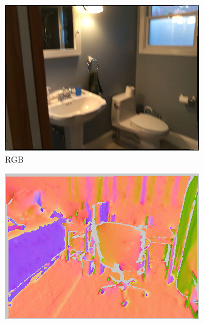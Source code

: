 \begin{figure}
\begin{minipage}{0.19\linewidth}
     \includegraphics[width=\linewidth]{FrameNet/Dataset/pred-000021-color.png}\\
     \vspace{-0.05in}
     RGB
    \end{minipage}
     \begin{minipage}{0.19\linewidth}
     \centering
     \includegraphics[width=\linewidth]{FrameNet/Dataset/pred-000001-X.png}\\

\end{minipage}
\end{figure}
